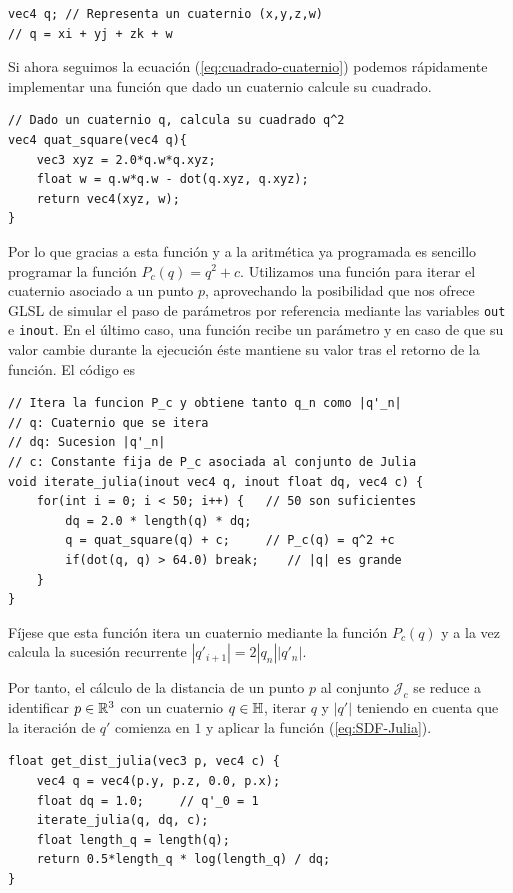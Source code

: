 \begin{lstlisting}
vec4 q; // Representa un cuaternio (x,y,z,w)
// q = xi + yj + zk + w
\end{lstlisting}

Si ahora seguimos la ecuación (\ref{eq:cuadrado-cuaternio}) podemos rápidamente implementar una función que dado un cuaternio calcule su cuadrado.

\begin{lstlisting}
// Dado un cuaternio q, calcula su cuadrado q^2
vec4 quat_square(vec4 q){
    vec3 xyz = 2.0*q.w*q.xyz;
    float w = q.w*q.w - dot(q.xyz, q.xyz);
    return vec4(xyz, w);
}
\end{lstlisting}

Por lo que gracias a esta función y a la aritmética ya programada es sencillo programar la función $P_c(q)=q^2+c$. Utilizamos una función para iterar el cuaternio asociado a un punto $p$, aprovechando la posibilidad que nos ofrece GLSL de simular el paso de parámetros por referencia mediante las variables \verb|out| e \verb|inout|. En el último caso, una función recibe un parámetro y en caso de que su valor cambie durante la ejecución éste mantiene su valor tras el retorno de la función. El código es 
\begin{lstlisting}
// Itera la funcion P_c y obtiene tanto q_n como |q'_n|
// q: Cuaternio que se itera
// dq: Sucesion |q'_n|
// c: Constante fija de P_c asociada al conjunto de Julia
void iterate_julia(inout vec4 q, inout float dq, vec4 c) {
    for(int i = 0; i < 50; i++) {   // 50 son suficientes
        dq = 2.0 * length(q) * dq;
        q = quat_square(q) + c;     // P_c(q) = q^2 +c
        if(dot(q, q) > 64.0) break;    // |q| es grande
    }
}
\end{lstlisting}

Fíjese que esta función itera un cuaternio mediante la función $P_c(q)$ y a la vez calcula la sucesión recurrente $|q'_{i+1}|=2|q_n||q'_n|$. 

Por tanto, el cálculo de la distancia de un punto $p$ al conjunto $\mathcal{J}_c$ se reduce a identificar $p\in\mathbb{R}^3$ con un cuaternio $q\in\mathbb{H}$, iterar $q$ y $|q'|$ teniendo en cuenta que la iteración de $q'$ comienza en $1$ y aplicar la función (\ref{eq:SDF-Julia}).

\begin{lstlisting}
float get_dist_julia(vec3 p, vec4 c) { 
    vec4 q = vec4(p.y, p.z, 0.0, p.x);
    float dq = 1.0;     // q'_0 = 1
    iterate_julia(q, dq, c);
    float length_q = length(q);
    return 0.5*length_q * log(length_q) / dq;
}
\end{lstlisting}

